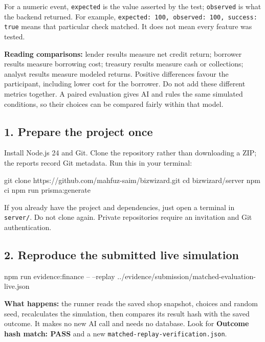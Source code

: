 \documentclass[10pt,a4paper]{article}
\begin{document}
For a numeric event, \texttt{expected} is the value asserted by the test; \texttt{observed} is what the backend returned. For example, \texttt{expected: 100, observed: 100, success: true} means that particular check matched. It does not mean every feature was tested.

\textbf{Reading comparisons:} lender results measure net credit return; borrower results measure borrowing cost; treasury results measure cash or collections; analyst results measure modeled returns. Positive differences favour the participant, including lower cost for the borrower. Do not add these different metrics together. A paired evaluation gives AI and rules the same simulated conditions, so their choices can be compared fairly within that model.

\EvidenceRevision


\clearpage
{}

\subsection*{1. Prepare the project once}
Install Node.js 24 and Git. Clone the repository rather than downloading a ZIP; the reports record Git metadata. Run this in your terminal:
\begin{CodeBlock}
git clone https://github.com/mahfuz-saim/bizwizard.git
cd bizwizard/server
npm ci
npm run prisma:generate
\end{CodeBlock}
If you already have the project and dependencies, just open a terminal in \texttt{server/}. Do not clone again. Private repositories require an invitation and Git authentication.

\subsection*{2. Reproduce the submitted live simulation}
\begin{CodeBlock}
npm run evidence:finance -- --replay ../evidence/submission/matched-evaluation-live.json
\end{CodeBlock}
\textbf{What happens:} the runner reads the saved shop snapshot, choices and random seed, recalculates the simulation, then compares its result hash with the saved outcome. It makes no new AI call and needs no database. Look for \textbf{Outcome hash match: PASS} and a new \texttt{matched-replay-verification.json}.
\end{document}
